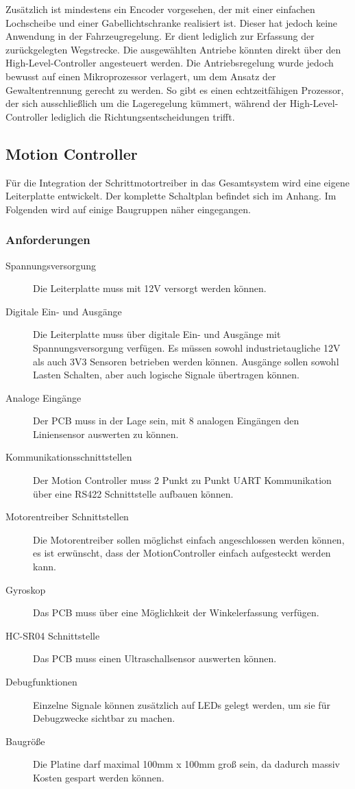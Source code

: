 \documentclass[main.  tex]{subfiles} %
\begin{document}
Zusätzlich ist mindestens ein Encoder vorgesehen, der mit einer einfachen
Lochscheibe und einer Gabellichtschranke realisiert ist. Dieser hat jedoch
keine Anwendung in der Fahrzeugregelung. Er dient lediglich zur Erfassung der
zurückgelegten Wegstrecke. Die ausgewählten Antriebe könnten direkt über den
High-Level-Controller angesteuert werden. Die Antriebsregelung wurde jedoch
bewusst auf einen Mikroprozessor verlagert, um dem Ansatz der Gewaltentrennung
gerecht zu werden. So gibt es einen echtzeitfähigen Prozessor, der sich
ausschließlich um die Lageregelung kümmert, während der High-Level-Controller
lediglich die Richtungsentscheidungen trifft.

\subsection*{Motion Controller} %

Für die Integration der Schrittmotortreiber in das Gesamtsystem wird eine
eigene Leiterplatte entwickelt. Der komplette Schaltplan befindet sich im
Anhang. Im Folgenden wird auf einige Baugruppen näher eingegangen.
\subsubsection*{Anforderungen}

\begin{description}
    \item[Spannungsversorgung] Die Leiterplatte muss mit 12V versorgt werden können.
    \item[Digitale Ein- und Ausgänge] Die Leiterplatte muss über digitale Ein- und
          Ausgänge mit Spannungsversorgung verfügen. Es müssen sowohl industrietaugliche
          12V als auch 3V3 Sensoren betrieben werden können. Ausgänge sollen sowohl
          Lasten Schalten, aber auch logische Signale übertragen können.
    \item[Analoge Eingänge] Der PCB muss in der Lage sein, mit 8 analogen Eingängen den
          Liniensensor auswerten zu können.
    \item[Kommunikationsschnittstellen] Der Motion Controller muss 2 Punkt zu Punkt UART
          Kommunikation über eine RS422 Schnittstelle aufbauen können.
    \item[Motorentreiber Schnittstellen] Die Motorentreiber sollen möglichst einfach
          angeschlossen werden können, es ist erwünscht, dass der MotionController
          einfach aufgesteckt werden kann.
    \item[Gyroskop] Das PCB muss über eine Möglichkeit der Winkelerfassung verfügen.
    \item[HC-SR04 Schnittstelle] Das PCB muss einen Ultraschallsensor auswerten können.
    \item[Debugfunktionen] Einzelne Signale können zusätzlich auf LEDs gelegt werden, um
          sie für Debugzwecke sichtbar zu machen.
    \item[Baugröße] Die Platine darf maximal 100mm x 100mm groß sein, da dadurch massiv
          Kosten gespart werden können.
\end{description}
\end{document}
